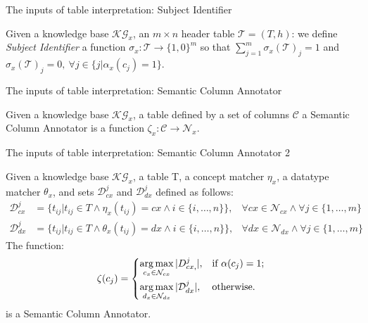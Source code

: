 \documentclass{beamer}
\DeclareMathOperator*{\argmax}{arg\,max}
\begin{document}
\begin{frame}{The inputs of table interpretation: Subject Identifier}
	\begin{definition}
		Given a knowledge base $\mathcal{KG}_x$, an $m\times n$ header table $\mathcal{T} =(T, h)$: we define \textit{Subject Identifier} a function $\sigma_x: \mathcal{T} \to \{1, 0\}^m$ so that $\displaystyle\sum^m_{j=1} \sigma_x(\mathcal{T})_j =1$ and $\sigma_x(\mathcal{T})_j = 0,~\forall j\in \{j | \alpha_x(c_j) =1\}$.
	\end{definition}
\end{frame}


\begin{frame}{The inputs of table interpretation: Semantic Column Annotator}
	\begin{definition}
		Given a knowledge base $\mathcal{KG}_x$, a table defined by a set of columns $\mathcal{C}$ a Semantic Column Annotator is a function $\zeta_x: \mathcal{C}\to \mathcal{N}_x$.
	\end{definition}
\end{frame}


\begin{frame}{The inputs of table interpretation: Semantic Column Annotator 2}
	\begin{lemma}
		Given a knowledge base $\mathcal{KG}_x$, a table T, a concept matcher $\eta_x$, a datatype matcher $\theta_x$, and sets $\mathcal{D}^j_{cx}$ and $\mathcal{D}^j_{dx}$ defined as follows:
		\begin{align*}
			\mathcal{D}^j_{cx} & =\{t_{ij} | t_{ij}\in T \wedge\eta_x(t_{ij}) =cx \wedge i \in \{i,\ldots, n\}\},    & \forall cx \in \mathcal{N}_{cx} \wedge \forall j \in \{1,\ldots,m\} \\
			\mathcal{D}^j_{dx} & =\{t_{ij} | t_{ij}\in T \wedge \theta_x(t_{ij}) =dx \wedge i \in \{i,\ldots, n\}\}, & \forall dx \in \mathcal{N}_{dx} \wedge \forall j \in \{1,\ldots,m\}
		\end{align*}
		The function:
		\begin{equation}
			\zeta(c_{j})=
			\begin{dcases*}
				\argmax_{c_x\in \mathcal{N}_{cx}}|D^j_{cx,}|, & if $\alpha(c_{j})=1$;
				\\
				\argmax_{d_x\in \mathcal{N}_{dx}}|\mathcal{D}^j_{dx}|,& otherwise.
			\end{dcases*}
		\end{equation}
		is a Semantic Column Annotator.
	\end{lemma}
\end{frame}
\end{document}
